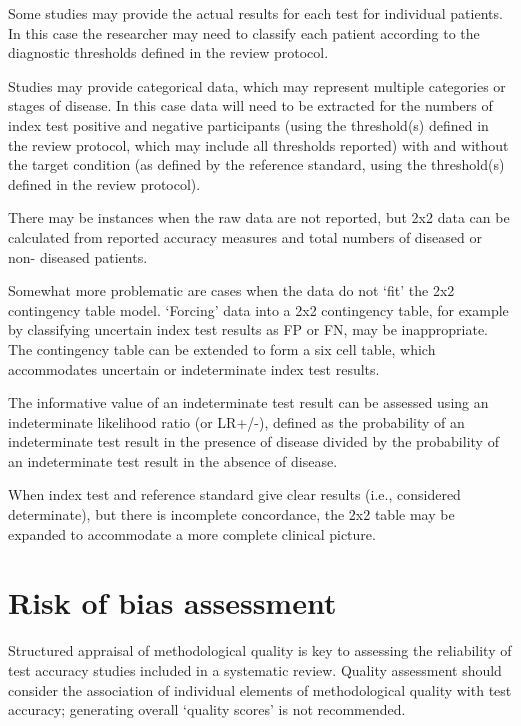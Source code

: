 \documentclass[
  11pt,
  a4paper,
  DIV=11,
  numbers=noendperiod]{scrreprt}
\begin{document}
Some studies may provide the actual results for each test for individual
patients. In this case the researcher may need to classify each patient
according to the diagnostic thresholds defined in the review protocol.

Studies may provide categorical data, which may represent multiple
categories or stages of disease. In this case data will need to be
extracted for the numbers of index test positive and negative
participants (using the threshold(s) defined in the review protocol,
which may include all thresholds reported) with and without the target
condition (as defined by the reference standard, using the threshold(s)
defined in the review protocol).

There may be instances when the raw data are not reported, but 2x2 data
can be calculated from reported accuracy measures and total numbers of
diseased or non- diseased patients.

Somewhat more problematic are cases when the data do not `fit' the 2x2
contingency table model. `Forcing' data into a 2x2 contingency table,
for example by classifying uncertain index test results as FP or FN, may
be inappropriate. The contingency table can be extended to form a six
cell table, which accommodates uncertain or indeterminate index test
results.

The informative value of an indeterminate test result can be assessed
using an indeterminate likelihood ratio (or LR+/-), defined as the
probability of an indeterminate test result in the presence of disease
divided by the probability of an indeterminate test result in the
absence of disease.

When index test and reference standard give clear results (i.e.,
considered determinate), but there is incomplete concordance, the 2x2
table may be expanded to accommodate a more complete clinical picture.

\section{Risk of bias assessment}\label{risk-of-bias-assessment-2}

Structured appraisal of methodological quality is key to assessing the
reliability of test accuracy studies included in a systematic review.
Quality assessment should consider the association of individual
elements of methodological quality with test accuracy; generating
overall `quality scores' is not recommended.
\end{document}
